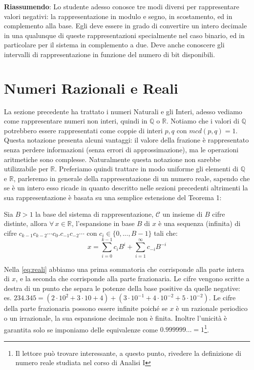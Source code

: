 \textbf{Riassumendo}: 
Lo studente adesso conosce tre modi diversi per rappresentare
valori negativi: la rappresentazione in modulo e segno, in scostamento, ed in
complemento alla base. Egli deve essere in grado di convertire un intero decimale in una qualunque di queste rappresentazioni specialmente nel caso
binario, ed in particolare per il sistema in complemento a due.
Deve anche conoscere gli intervalli di rappresentazione in funzione del numero di bit disponibili. 

\section{Numeri Razionali e Reali}

La sezione precedente ha trattato i numeri Naturali e gli Interi, adesso
vediamo come rappresentare numeri non interi, quindi in $\mathbb{Q}$ o
$\mathbb{R}$. Notiamo che i valori di $\mathbb{Q}$ potrebbero essere
rappresentati come coppie di interi $p, q$ con $mcd(p,q) = 1$. Questa notazione
presenta alcuni vantaggi: il valore della frazione è rappresentato senza
perdere informazioni (senza errori di approssimazione), ma le operazioni
aritmetiche sono complesse. Naturalmente questa notazione non sarebbe
utilizzabile per $\mathbb{R}$. Preferiamo quindi trattare in modo uniforme gli
elementi di $\mathbb{Q}$ e $\mathbb{R}$, parleremo in generale della
rappresentazione di un numero reale, sapendo che se è un intero esso ricade in
quanto descritto nelle sezioni precedenti altrimenti la sua rappresentazione è
basata su una semplice estensione del Teorema 1:
\begin{thm}
\label{thm:F}
Sia $B>1$ la base del sistema di rappresentazione, $\mathcal{C}$ un insieme
di $B$ cifre distinte, allora $\forall\, x \in \mathbb{R}$, l'espansione in base $B$ di $x$ è una sequenza (infinita) di cifre $c_{k-1}c_{k-2}{\cdots}c_0\mathbf{.}c_{-1}c_{-2}\cdots$ con $c_i \in \{0,...,B-1\}$ tali che:
\begin{equation}\label{eq:reali}
	x = \sum_{i=0}^{k-1} c_iB^i + \sum_{i=1}^{\infty} c_{-i}B^{-i}
\end{equation}
\end{thm}

Nella \eqref{eq:reali} abbiamo una prima sommatoria che corrisponde alla parte
intera di $x$, e la seconda che corrisponde alla parte frazionaria. Le cifre
vengono scritte a destra di un punto che separa le potenze della base positive
da quelle negative: es. $234.345 =
(2\cdot10^2+3\cdot10+4)+(3\cdot10^{-1}+4\cdot10^{-2}+5\cdot10^{-2})$. Le cifre
della parte frazionaria possono essere infinite poiché se $x$ è un razionale
periodico o un irrazionale, la sua espansione decimale non è finita. Inoltre
l'unicità è garantita solo se imponiamo delle equivalenze come $0.999999\ldots = 1$\footnote{Il lettore può trovare interessante, a questo punto, rivedere la definizione di numero reale studiata nel corso di Analisi I}.

